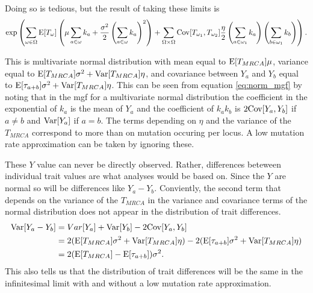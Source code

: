 Doing so is tedious, but the result of taking these limits is
\begin{equation}
  \label{eq:norm_mgf}
  \exp \left( \sum_{\omega \in \Omega}\mathrm{E}[T_{\omega}] \left( \mu 
  \sum_{a \in \omega} k_a + \frac{\sigma^2}{2}\left( \sum_{a \in \omega}
  k_a\right)^2\right) +
\sum_{\Omega \times \Omega} \mathrm{Cov}[T_{\omega_1},T_{\omega_2}]\frac{\eta}{2}
\left(\sum_{a \in \omega_1} k_a\right) \left(\sum_{b \in \omega_1} k_b\right)\right).
\end{equation}

This is multivariate normal distribution with mean equal to $\mathrm{E}[T_{MRCA}]\mu$,
variance equal to $\mathrm{E}[T_{MRCA}]\sigma^2 + \mathrm{Var}[T_{MRCA}]\eta$, and covariance
between $Y_a$ and $Y_b$ equal to $\mathrm{E}[\tau_{a+b}]\sigma^2 + \mathrm{Var}[T_{MRCA}]\eta$.
This can be seen from equation \eqref{eq:norm_mgf} by noting that in the mgf for
a multivariate normal distribution the coefficient in the exponential of $k_a$
is the mean of $Y_a$ and the coefficient of $k_ak_b$ is $2\mathrm{Cov}[Y_a,Y_b]$ if
$a\neq b$ and $\mathrm{Var}[Y_a]$ if $a=b$. The terms depending on $\eta$ and the
variance of the $T_{MRCA}$ correspond to more than on mutation occuring per
locus. A low mutation rate approximation can be taken by ignoring these.

These $Y$ value can never be directly observed. Rather, differences beteween
individual trait values are what analyses would be based on. Since the $Y$ are
normal so will be differences like $Y_a-Y_b$. Conviently, the second term that
depends on the variance of the $T_{MRCA}$ in the variance and covariance terms
of the normal distribution does not appear in the distribution of trait
differences.
\begin{align*}
  \mathrm{Var}[Y_a-Y_b] &= Var[Y_a] + \mathrm{Var}[Y_b] - 2\mathrm{Cov}[Y_a,Y_b]\\
                &= 2(\mathrm{E}[T_{MRCA}]\sigma^2 + \mathrm{Var}[T_{MRCA}]\eta) -
                  2(\mathrm{E}[\tau_{a+b}]\sigma^2 + \mathrm{Var}[T_{MRCA}]\eta)\\
                &= 2(\mathrm{E}[T_{MRCA}] - \mathrm{E}[\tau_{a+b}])\sigma^2.
\end{align*}
This also tells us that the distribution of trait differences will be the same
in the infinitesimal limit with and without a low mutation rate approximation.

